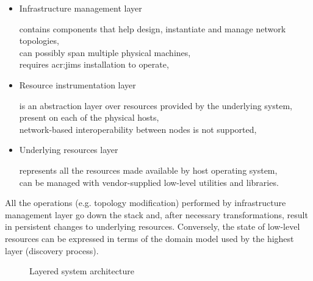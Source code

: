 \documentclass[11pt]{book}
\begin{document}
      \begin{itemize}

        \item Infrastructure management layer

              contains components that help design, instantiate and manage network topologies, \\
              can possibly span multiple physical machines, \\
              requires \gls{acr:jims} installation to operate,

        \item Resource instrumentation layer

              is an abstraction layer over resources provided by the underlying system, \\
              present on each of the physical hosts, \\
              network-based interoperability between nodes is not supported,

        \item Underlying resources layer

              represents all the resources made available by host operating system, \\
              can be managed with vendor-supplied low-level utilities and libraries.

      \end{itemize}

      All the operations (e.g. topology modification) performed by infrastructure management layer go down the stack
      and, after necessary transformations, result in persistent changes to underlying resources. Conversely, the state
      of low-level resources can be expressed in terms of the domain model used by the highest layer (discovery
      process).

      \begin{figure}[H]
        \begin{center}
        \end{center}

        \caption{Layered system architecture}
        \label{fig:arch:layers}
      \end{figure}
\end{document}
